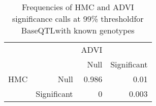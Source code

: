 \begin{table}[ht]
\centering
\caption{Frequencies of HMC and ADVI significance calls at 99\% thresholdfor BaseQTLwith known genotypes} 
\label{tab:GT-xtab-prop-99}
\begin{tabular}{rr|rr}
   &  & ADVI &  \\ 
    &   & Null & Significant \\ 
   \hline
HMC & Null & 0.986 & 0.01 \\ 
    & Significant & 0 & 0.003 \\ 
  \end{tabular}
\end{table}
